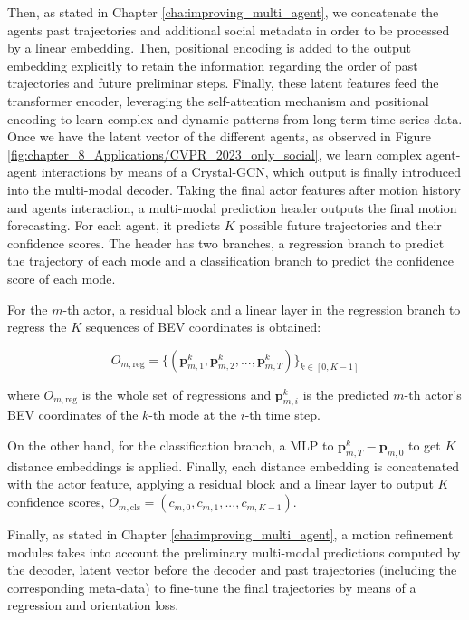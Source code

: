 Then, as stated in Chapter \ref{cha:improving_multi_agent}, we concatenate the agents past trajectories and additional social metadata in order to be processed by a linear embedding. Then, positional encoding is added to the output embedding explicitly to retain the information regarding the order of past trajectories and future preliminar steps. Finally, these latent features feed the transformer encoder, leveraging the self-attention mechanism and positional encoding to learn complex and dynamic patterns from long-term time series data. Once we have the latent vector of the different agents, as observed in Figure \ref{fig:chapter_8_Applications/CVPR_2023_only_social}, we learn complex agent-agent interactions by means of a Crystal-\ac{GCN}, which output is finally introduced into the multi-modal decoder. Taking the final actor features after motion history and agents interaction, a multi-modal prediction header outputs the final motion forecasting. For each agent, it predicts $K$ possible future trajectories and their confidence scores. The header has two branches, a regression branch to predict the trajectory of each mode and a classification branch to predict the confidence score of each mode.

For the $m$-th actor, a residual block and a linear layer in the regression branch to regress the $K$ sequences of BEV coordinates is obtained:

\begin{equation}
	O_{m, \text{reg}} = \{ (\mathbf{p}_{m,1}^k, \mathbf{p}_{m,2}^k, ..., \mathbf{p}_{m,T}^k) \}_{k \in [0, K-1]}
\end{equation}

where $O_{m, \text{reg}}$ is the whole set of regressions and $\mathbf{p}_{m,i}^k$ is the predicted $m$-th actor's BEV coordinates of the $k$-th mode at the $i$-th time step.

On the other hand, for the classification branch, a MLP to $\mathbf{p}_{m,T}^k - \mathbf{p}_{m,0}$ to get $K$ distance embeddings is applied. Finally, each distance embedding is concatenated with the actor feature, applying a residual block and a linear layer to output $K$ confidence scores, $O_{m, \text{cls}} = (c_{m,0}, c_{m,1}, ..., c_{m,K-1})$.

Finally, as stated in Chapter \ref{cha:improving_multi_agent}, a motion refinement modules takes into account the preliminary multi-modal predictions computed by the decoder, latent vector before the decoder and past trajectories (including the corresponding meta-data) to fine-tune the final trajectories by means of a regression and orientation loss.


